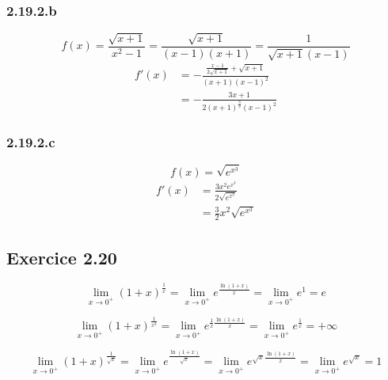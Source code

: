 \documentclass[a4paper,10pt]{report}
\begin{document}
\subsubsection*{2.19.2.b}
\begin{displaymath}
	f(x) = \frac{\sqrt{x+1}}{x^2-1} = \frac{\sqrt{x+1}}{(x-1)(x+1)}= \frac{1}{\sqrt{x+1}(x-1)}
\end{displaymath}
\begin{equation*}
	\begin{split}
		f'(x) &= -\frac{\frac{x-1}{2\sqrt{x+1}} + \sqrt{x+1}}{(x+1)(x-1)^2} \\
		      & = -\frac{3x+1}{2(x+1)^{\frac{3}{2}} (x-1)^2}
	\end{split}	
\end{equation*}

\subsubsection*{2.19.2.c}
\begin{displaymath}
	f(x) = \sqrt{e^{x^3}}
\end{displaymath}
\begin{equation*}
	\begin{split}
		f'(x) &= \frac{3x^2 e^{x^3}}{2\sqrt{e^{x^3}}} \\
		      &= \frac{3}{2}x^2 \sqrt{e^{x^3}}
	\end{split}	
\end{equation*}


\subsection*{Exercice 2.20}
\begin{displaymath}
	\lim_{x \rightarrow 0^{+}} (1+x)^\frac{1}{x}
		= \lim_{x \rightarrow 0^{+}} e^{\frac{\ln(1+x)}{x}}
		= \lim_{x \rightarrow 0^{+}} e^{1} 
		= e
\end{displaymath}

\begin{displaymath}
	\lim_{x \rightarrow 0^{+}} (1+x)^\frac{1}{x^2} 
		= \lim_{x \rightarrow 0^{+}} e^{\frac{1}{x}\frac{\ln(1+x)}{x}} 
		= \lim_{x \rightarrow 0^{+}} e^{\frac{1}{x}}
		= +\infty
\end{displaymath}

\begin{displaymath}
	\lim_{x \rightarrow 0^{+}} (1+x)^\frac{1}{\sqrt{x}} 
		= \lim_{x \rightarrow 0^{+}} e^{\frac{\ln(1+x)}{\sqrt{x}}} 
		= \lim_{x \rightarrow 0^{+}} e^{\sqrt{x}\frac{\ln(1+x)}{x}}
		= \lim_{x \rightarrow 0^{+}} e^{\sqrt{x}}
		= 1
\end{displaymath}
\end{document}
